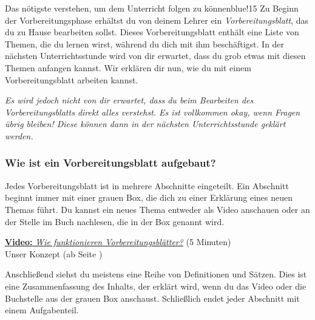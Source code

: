 \documentclass[../main.tex]{subfiles}
\begin{document}
\begin{goal}{Das nötigste verstehen, um dem Unterricht folgen zu können}{blue!15}\label{vorbereitungsblaetter}
    Zu Beginn der Vorbereitungsphase erhältst du von deinem Lehrer ein \emph{Vorbereitungsblatt}, das du zu Hause bearbeiten sollst. Dieses Vorbereitungsblatt enthält eine Liste von Themen, die du lernen wirst, während du dich mit ihm beschäftigst. In der nächsten Unterrichtsstunde wird von dir erwartet, dass du grob etwas mit diesen Themen anfangen kannst. Wir erklären dir nun, wie du mit einem Vorbereitungsblatt arbeiten kannst.

    \emph{Es wird jedoch nicht von dir erwartet, dass du beim Bearbeiten des Vorbereitungsblatts direkt alles verstehst. Es ist vollkommen okay, wenn Fragen übrig bleiben! Diese können dann in der nächsten Unterrichtsstunde geklärt werden.}

    \subsubsection*{Wie ist ein Vorbereitungsblatt aufgebaut?}

    Jedes Vorbereitungsblatt ist in mehrere Abschnitte eingeteilt. Ein Abschnitt beginnt immer mit einer grauen Box, die dich zu einer Erklärung eines neuen Themas führt. Du kannst ein neues Thema entweder als Video anschauen oder an der Stelle im Buch nachlesen, die in der Box genannt wird.

    \begin{video}
        \begin{minipage}{.1\textwidth}
        \end{minipage}
        \begin{minipage}{.9\textwidth}
            \href{https://themrsheldon.github.io/testing/}{\textbf{Video:} \textit{Wie funktionieren Vorbereitungsblätter?}} (5 Minuten)\\
            Unser Konzept (ab Seite \pageref{vorbereitungsblaetter})
        \end{minipage}
    \end{video}

    Anschließend siehst du meistens eine Reihe von Definitionen und Sätzen. Dies ist eine Zusammenfassung des Inhalts, der erklärt wird, wenn du das Video oder die Buchstelle aus der grauen Box anschaust. Schließlich endet jeder Abschnitt mit einem Aufgabenteil.


\end{goal}
\end{document}
